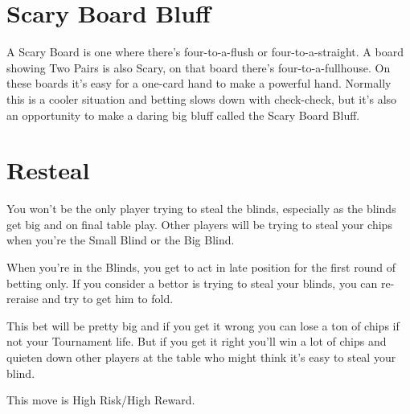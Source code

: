 \section{Scary Board Bluff}

A Scary Board is one where there's four-to-a-flush or four-to-a-straight.
A board showing Two Pairs is also Scary, on that board there's
four-to-a-fullhouse.  On these boards it's easy for a one-card hand
to make a powerful hand. Normally this is a cooler situation and
betting slows down with check-check, but it's also an opportunity
to make a daring big bluff called the Scary Board Bluff.

\section{Resteal}

You won't be the only player trying to steal the blinds, especially
as the blinds get big and on final table play. Other players will
be trying to steal your chips when you're the Small Blind or the
Big Blind.

When you're in the Blinds, you get to act in late position for
the first round of betting only. If you consider a bettor is
trying to steal your blinds, you can re-reraise and try to
get him to fold.

This bet will be pretty big and if you get it wrong you can
lose a ton of chips if not your Tournament life. But if you get
it right you'll win a lot of chips and quieten down other
players at the table who might think it's easy to steal your blind.

This move is High Risk/High Reward.
